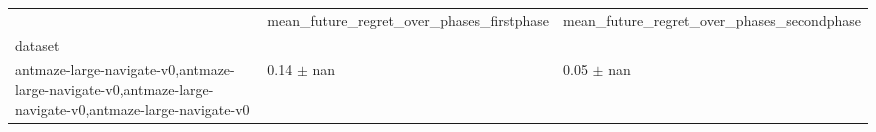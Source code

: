 \begin{tabular}{lll}
\toprule
 & mean_future_regret_over_phases_firstphase & mean_future_regret_over_phases_secondphase \\
dataset &  &  \\
\midrule
antmaze-large-navigate-v0,antmaze-large-navigate-v0,antmaze-large-navigate-v0,antmaze-large-navigate-v0 & 0.14 $\pm$ nan & 0.05 $\pm$ nan \\
\bottomrule
\end{tabular}
